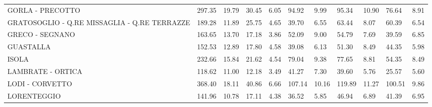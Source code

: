 \begin{table}[H]
{{\begin{tabular}{lp{1.3cm}p{1.3cm}p{1.3cm}p{1.3cm}p{1.3cm}p{1.3cm}p{1.3cm}p{1.3cm}p{1.3cm}p{1.3cm}}
GORLA - PRECOTTO                                   &                    297.35 &                 19.79 &                       30.45 &                    6.05 &                       94.92 &                    9.99 &                       95.34 &                   10.90 &                     76.64 &                  8.91 \\
GRATOSOGLIO - Q.RE MISSAGLIA - Q.RE TERRAZZE       &                    189.28 &                 11.89 &                       25.75 &                    4.65 &                       39.70 &                    6.55 &                       63.44 &                    8.07 &                     60.39 &                  6.54 \\
GRECO - SEGNANO                                    &                    163.65 &                 13.70 &                       17.18 &                    3.86 &                       52.09 &                    9.00 &                       54.79 &                    7.69 &                     39.59 &                  6.85 \\
GUASTALLA                                          &                    152.53 &                 12.89 &                       17.80 &                    4.58 &                       39.08 &                    6.13 &                       51.30 &                    8.49 &                     44.35 &                  5.98 \\
ISOLA                                              &                    232.66 &                 15.84 &                       21.62 &                    4.54 &                       79.04 &                    9.38 &                       77.65 &                    8.81 &                     54.35 &                  8.49 \\
LAMBRATE - ORTICA                                  &                    118.62 &                 11.00 &                       12.18 &                    3.49 &                       41.27 &                    7.30 &                       39.60 &                    5.76 &                     25.57 &                  5.60 \\
LODI - CORVETTO                                    &                    368.40 &                 18.11 &                       40.86 &                    6.66 &                      107.14 &                   10.16 &                      119.89 &                   11.27 &                    100.51 &                  9.86 \\
LORENTEGGIO                                        &                    141.96 &                 10.78 &                       17.11 &                    4.38 &                       36.52 &                    5.85 &                       46.94 &                    6.89 &                     41.39 &                  6.95 \\

\end{tabular}}}
\end{table}
